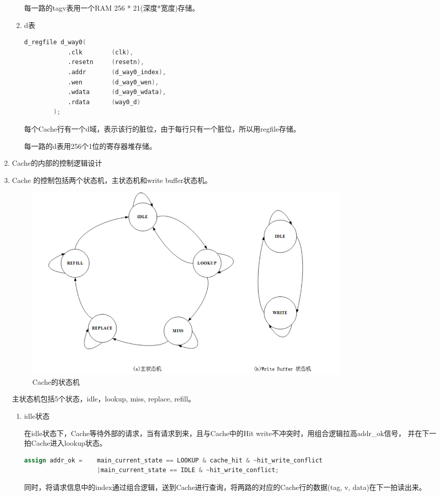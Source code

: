 \documentclass[11pt]{article}
\begin{document}
\begin{enumerate}
\begin{enumerate}
        每一路的tagv表用一个RAM 256 * 21(深度*宽度)存储。
        \item d表
    \begin{lstlisting}[language=verilog]
        d_regfile d_way0(
            .clk        (clk),
            .resetn     (resetn),
            .addr       (d_way0_index),
            .wen        (d_way0_wen),
            .wdata      (d_way0_wdata),
            .rdata      (way0_d)
        );   
    \end{lstlisting}
        每个Cache行有一个d域，表示该行的脏位，由于每行只有一个脏位，所以用regfile存储。

        每一路的d表用256个1位的寄存器堆存储。
    \end{enumerate}
    \item Cache的内部的控制逻辑设计
    \item 
    Cache 的控制包括两个状态机，主状态机和write buffer状态机。
    \begin{figure}[H]
        \centering
        \includegraphics[width=0.8\textwidth]{fig/fig2.png}
        \caption{Cache的状态机}
        \label{fig:2}
    \end{figure}    
        
        主状态机包括5个状态，idle，lookup, miss, replace, refill。

        \begin{enumerate}
            \item idle状态
            
            在idle状态下，Cache等待外部的请求，当有请求到来，且与Cache中的Hit write不冲突时，用组合逻辑拉高addr\_ok信号，
            并在下一拍Cache进入lookup状态。
 \begin{lstlisting}[language=verilog]
assign addr_ok =    main_current_state == LOOKUP & cache_hit & ~hit_write_conflict
                    |main_current_state == IDLE & ~hit_write_conflict;
 \end{lstlisting}
 同时，将请求信息中的index通过组合逻辑，送到Cache进行查询，将两路的对应的Cache行的数据(tag, v, data)在下一拍读出来。


\end{enumerate}
\end{enumerate}
\end{document}
